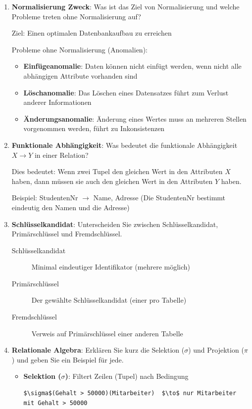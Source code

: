 \documentclass[a4paper]{article}
\begin{document}
\begin{enumerate}
    \item \textbf{Normalisierung Zweck}: Was ist das Ziel von Normalisierung und welche Probleme 
    treten ohne Normalisierung auf?
    
    Ziel: Einen optimalen Datenbankaufbau zu erreichen
    
    Probleme ohne Normalisierung (Anomalien):
    \begin{itemize}
        \item \textbf{Einfügeanomalie}: Daten können nicht einfügt werden, wenn nicht alle 
        abhängigen Attribute vorhanden sind
        \item \textbf{Löschanomalie}: Das Löschen eines Datensatzes führt zum Verlust anderer Informationen
        \item \textbf{Änderungsanomalie}: Änderung eines Wertes muss an mehreren Stellen vorgenommen 
        werden, führt zu Inkonsistenzen
    \end{itemize}
    
    \item \textbf{Funktionale Abhängigkeit}: Was bedeutet die funktionale Abhängigkeit $X \to Y$ 
    in einer Relation?
    
    Dies bedeutet: Wenn zwei Tupel den gleichen Wert in den Attributen $X$ haben, dann müssen sie 
    auch den gleichen Wert in den Attributen $Y$ haben.
    
    Beispiel: StudentenNr $\to$ Name, Adresse
    (Die StudentenNr bestimmt eindeutig den Namen und die Adresse)
    
    \item \textbf{Schlüsselkandidat}: Unterscheiden Sie zwischen Schlüsselkandidat, Primärschlüssel 
    und Fremdschlüssel.
    
    \begin{description}
        \item[Schlüsselkandidat] Minimal eindeutiger Identifikator (mehrere möglich)
        \item[Primärschlüssel] Der gewählte Schlüsselkandidat (einer pro Tabelle)
        \item[Fremdschlüssel] Verweis auf Primärschlüssel einer anderen Tabelle
    \end{description}
    
    \newpage
    \item \textbf{Relationale Algebra}: Erklären Sie kurz die Selektion ($\sigma$) und Projektion ($\pi$) 
    und geben Sie ein Beispiel für jede.
    
    \begin{itemize}
        \item \textbf{Selektion ($\sigma$)}: Filtert Zeilen (Tupel) nach Bedingung
        \begin{lstlisting}
$\sigma$(Gehalt > 50000)(Mitarbeiter)  $\to$ nur Mitarbeiter mit Gehalt > 50000
        \end{lstlisting}
        

\end{itemize}
\end{enumerate}
\end{document}
